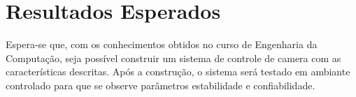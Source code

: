 \documentclass[12pt,a4paper]{article}
\begin{document}
\section{Resultados Esperados}
	Espera-se que, com os conhecimentos obtidos no curso de Engenharia da Computação, seja possível construir um sistema de controle de camera com as características descritas. Após a construção, o sistema será testado em ambiante controlado para que se observe parâmetros estabilidade e confiabilidade.



\nocite{*}


\end{document}
